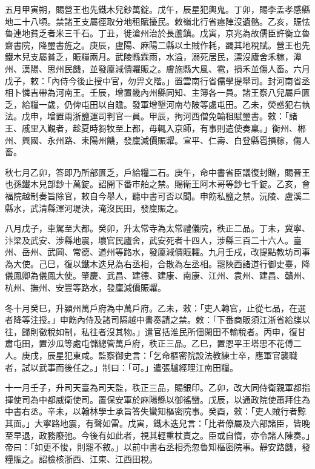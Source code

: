 \begin{pinyinscope}
 五月甲寅朔，賜營王也先鐵木兒鈔萬錠。戊午，辰星犯輿鬼。丁卯，賜李孟孝感縣地二十八頃。禁諸王支屬徑取分地租賦擾民。敕嶺北行省瘞陣沒遺骼。乙亥，賑怯魯連地貧乏者米三千石。丁丑，徙滄州治於長蘆鎮。戊寅，京兆為故儒臣許衡立魯齋書院，降璽書旌之。庚辰，盧陽、麻陽二縣以土賊作耗，蠲其地稅賦。營王也先鐵木兒支屬貧乏，賑糧兩月。武陵縣霖雨，水溢，溺死居民，漂沒廬舍禾稼，潭州、漢陽、思州民饑，並發廩減價糶賑之。膚施縣大風、雹，損禾並傷人畜。六月戊子，敕：「內侍今後止授中官，勿畀文階。」置雲南行省儒學提舉司。封河南省丞相卜憐吉帶為河南王。壬辰，增置畿內州縣同知、主簿各一員。諸王察八兒屬戶匱乏，給糧一歲，仍俾屯田以自贍。發軍增墾河南芍陂等處屯田。乙未，熒惑犯右執法。戊申，增置兩浙鹽運司判官一員。甲辰，拘河西僧免輸租賦璽書。敕：「諸王、戚里入覲者，趁夏時芻牧至上都，毋輒入京師，有事則遣使奏稟。」衡州、郴州、興國、永州路、耒陽州饑，發廩減價賑糶。宣平、仁壽、白登縣雹損稼，傷人畜。



 秋七月乙卯，答即乃所部匱乏，戶給糧二石。庚午，命中書省臣議復封贈，賜晉王也孫鐵木兒部鈔十萬錠。詔開下番市舶之禁。賜衛王阿木哥等鈔七千錠。乙亥，會福院越制奏旨除官，敕自今舉人，聽中書可否以聞。申飭私鹽之禁。沅陵、盧溪二縣水，武清縣渾河堤決，淹沒民田，發廩賑之。



 八月戊子，車駕至大都。癸卯，升太常寺為太常禮儀院，秩正二品。丁未，冀寧、汴梁及武安、涉縣地震，壞官民廬舍，武安死者十四人，涉縣三百二十六人。臺州、岳州、武岡、常德、道州等路水，發廩減價賑糶。九月壬戌，改提點教坊司事為大使。己巳，復以鐵木迭兒為右丞相，合散為左丞相。罷陜西諸道行御史臺，降儀鳳卿為儀鳳大使。肇慶、武昌、建德、建康、南康、江州、袁州、建昌、贛州、杭州、撫州、安豐等路水，發廩減價賑糶。



 冬十月癸巳，升潁州萬戶府為中萬戶府。乙未，敕：「吏人轉官，止從七品，在選者降等注授。」申飭內侍及諸司隔越中書奏請之禁。敕：「下番商販須江浙省給牒以往，歸則徵稅如制，私往者沒其物。」遣官括淮民所佃閑田不輸稅者。丙申，復甘肅屯田，置沙瓜等處屯儲總管萬戶府，秩正三品。乙巳，置恩平王塔思不花傅二人。庚戌，辰星犯東咸。監察御史言：「乞命樞密院設法教練士卒，應軍官襲職者，試以武事而後任之。」制曰：「可。」遣張驢經理江南田糧。



 十一月壬子，升司天臺為司天監，秩正三品，賜銀印。乙卯，改大同侍衛親軍都指揮使司為中都威衛使司。置保安軍於麻陽縣以御徭蠻。戊辰，以通政院使蕭拜住為中書右丞。辛未，以翰林學士承旨答失蠻知樞密院事。癸酉，敕：「吏人賊行者黥其面。」大寧路地震，有聲如雷。戊寅，鐵木迭兒言：「比者僚屬及六部諸臣，皆晚至早退，政務廢弛。今後有如此者，視其輕重杖責之。臣或自惰，亦令諸人陳奏。」帝曰：「如更不悛，則罷不敘。」以前中書右丞相禿忽魯知樞密院事。靜安路饑，發糧賑之。詔檢核浙西、江東、江西田稅。




\end{pinyinscope}
